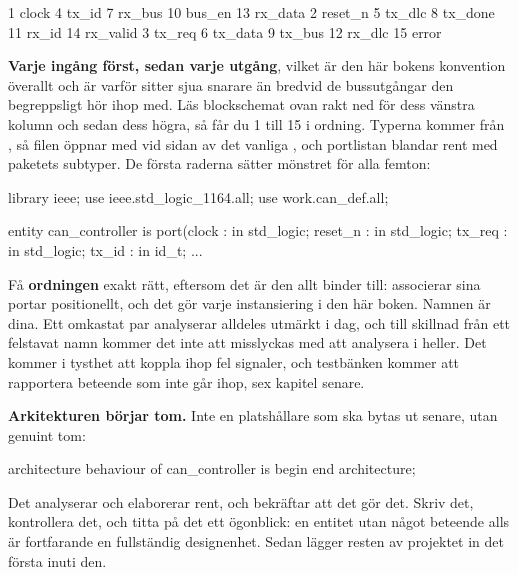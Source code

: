 \begin{textdrawing}
 1 clock       4 tx_id     7 rx_bus     10 bus_en    13 rx_data
 2 reset_n     5 tx_dlc    8 tx_done    11 rx_id     14 rx_valid
 3 tx_req      6 tx_data   9 tx_bus     12 rx_dlc    15 error
\end{textdrawing}

\textbf{Varje ingång först, sedan varje utgång}, vilket är den här bokens konvention överallt och är
varför  sitter sjua snarare än bredvid de bussutgångar den begreppsligt hör ihop med.
Läs blockschemat ovan rakt ned för dess vänstra kolumn och sedan dess högra, så får du 1 till 15 i
ordning. Typerna kommer från , så filen öppnar med  vid
sidan av det vanliga , och portlistan blandar rent  med
paketets subtyper. De första raderna sätter mönstret för alla femton:

\begin{vhdlcode}
library ieee;
use ieee.std_logic_1164.all;
use work.can_def.all;

entity can_controller is
    port(clock   : in std_logic;
         reset_n : in std_logic;
         tx_req  : in std_logic;
         tx_id   : in id_t;
         ...
\end{vhdlcode}

\begin{warning}
Få \textbf{ordningen} exakt rätt, eftersom det är den allt binder till: 
associerar sina portar positionellt, och det gör varje instansiering i den här boken. Namnen är
dina. Ett omkastat par analyserar alldeles utmärkt i dag, och till skillnad från ett felstavat namn
kommer det inte att misslyckas med att analysera i  heller. Det kommer i tysthet att
koppla ihop fel signaler, och testbänken kommer att rapportera beteende som inte går ihop, sex
kapitel senare.
\end{warning}

\textbf{Arkitekturen börjar tom.} Inte en platshållare som ska bytas ut senare, utan genuint tom:

\begin{vhdlcode}
architecture behaviour of can_controller is
begin
end architecture;
\end{vhdlcode}

Det analyserar och elaborerar rent, och  bekräftar att det gör det. Skriv det,
kontrollera det, och titta på det ett ögonblick: en entitet utan något beteende alls är fortfarande
en fullständig designenhet. Sedan lägger resten av projektet in det första inuti den.

